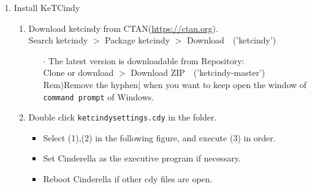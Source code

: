 \documentclass{article}
\begin{document}
\begin{enumerate}[\bf\large 1.]
\item Install KeTCindy
  \begin{enumerate}[(1)]
  \item Download ketcindy from CTAN(\url{https://ctan.org}).\\
  \hspace*{10mm}Search ketcindy $>$ Pack­age ketcindy $>$ Download\ \ ('ketcindy')
    \begin{itemize}
    \item[$\cdot$]The {\color{red}latest version} is downloadable from Repository:\\
         \hspace*{10mm}Clone or download $>$ Download ZIP\ \ ('ketcindy-master')\\
        \hspace*{5mm}Rem)Remove the hyphen| when you want to keep open the window of \verb|command prompt| of Windows.
    \end{itemize}
  \item Double click \verb|ketcindysettings.cdy| in the folder.
    \begin{itemize}
   \item  Select (1),(2) in the following figure, and execute (3) in order.
    \item Set Cinderella as the executive program if necessary.
    \item Reboot Cinderella if other cdy files are open.
   \end{itemize}
  \end{enumerate}



\end{enumerate}
\end{document}
